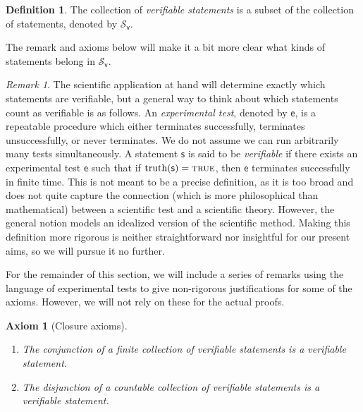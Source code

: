 \documentclass[psamsfonts]{amsart}
\newtheorem{axiom}[thm]{Axiom}
\theoremstyle{definition}
\newtheorem{defn}[thm]{Definition}
\theoremstyle{remark}
\newtheorem{rem}[thm]{Remark}
\numberwithin{equation}{section}
\DeclareMathOperator{\truth}{truth}
\def\TRUE{\textsc{true}}
\def\vstmtSet{\mathcal{S}_\textsf{v}}
\newcommand{\stmt}[1][s] {\mathsf{#1}}
\newcommand{\expt}[1][e] {\mathsf{#1}}
\begin{document}
\begin{defn}\label{verifiable_statements}
The collection of \emph{verifiable statements} is a subset of the collection of statements, denoted by $\vstmtSet$. 
\end{defn}

The remark and axioms below will make it a bit more clear what kinds of statements belong in $\vstmtSet$. 

\begin{rem}
The scientific application at hand will determine exactly which statements are verifiable, but a general way to think about which statements count as verifiable is as follows. An \emph{experimental test}, denoted by $\expt$, is a repeatable procedure which either terminates successfully, terminates unsuccessfully, or never terminates. We do not assume we can run arbitrarily many tests simultaneously. A statement $\stmt$ is said to be \emph{verifiable} if there exists an experimental test $\expt$ such that if $\truth(\stmt)=\TRUE$, then $\expt$ terminates successfully in finite time. This is not meant to be a precise definition, as it is too broad and does not quite capture the connection (which is more philosophical than mathematical) between a scientific test and a scientific theory. However, the general notion models an idealized version of the scientific method. Making this definition more rigorous is neither straightforward nor insightful for our present aims, so we will pursue it no further. 

For the remainder of this section, we will include a series of remarks using the language of experimental tests to give non-rigorous justifications for some of the axioms. However, we will not rely on these for the actual proofs. 
\end{rem}

\begin{axiom}[Closure axioms]
\begin{enumerate}
\item	The conjunction of a finite collection of verifiable statements is a verifiable statement. 
\item The disjunction of a countable collection of verifiable statements is a verifiable statement. 
\end{enumerate}
\end{axiom}
\end{document}
